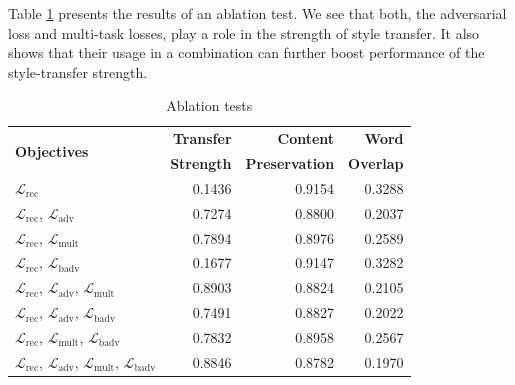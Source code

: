 Table \ref{tab:ablation-results} presents the results of an ablation test. We see that both, the adversarial loss and multi-task losses, play a role in the strength of style transfer. It also shows that their usage in a combination can further boost performance of the style-transfer strength.

\begin{table}[ht]
	\centering
	\begin{tabular}{| l | r | r | r |}
		\hline
		\multirow{2}{*}{
		\textbf{Objectives}}                                                                                     & \textbf{Transfer} & \textbf{Content}      & \textbf{Word}    \\
		                                                                                                         & \textbf{Strength} & \textbf{Preservation} & \textbf{Overlap} \\
		\hline
		\hline
		$\mathcal{L}_\text{rec}$                                                                                 & 0.1436            & 0.9154                & 0.3288           \\
		\hline
		$\mathcal{L}_\text{rec}$, $\mathcal{L}_\text{adv}$                                                       & 0.7274            & 0.8800                & 0.2037           \\
		\hline
		$\mathcal{L}_\text{rec}$, $\mathcal{L}_\text{mult}$                                                      & 0.7894            & 0.8976                & 0.2589           \\
		\hline
		$\mathcal{L}_\text{rec}$, $\mathcal{L}_\text{badv}$                                                      & 0.1677            & 0.9147                & 0.3282           \\
		\hline
		$\mathcal{L}_\text{rec}$, $\mathcal{L}_\text{adv}$, $\mathcal{L}_\text{mult}$                            & 0.8903            & 0.8824                & 0.2105           \\
		\hline
		$\mathcal{L}_\text{rec}$, $\mathcal{L}_\text{adv}$, $\mathcal{L}_\text{badv}$                            & 0.7491            & 0.8827                & 0.2022           \\
		\hline
		$\mathcal{L}_\text{rec}$, $\mathcal{L}_\text{mult}$, $\mathcal{L}_\text{badv}$                           & 0.7832            & 0.8958                & 0.2567           \\
		\hline
		$\mathcal{L}_\text{rec}$, $\mathcal{L}_\text{adv}$, $\mathcal{L}_\text{mult}$, $\mathcal{L}_\text{badv}$ & 0.8846            & 0.8782                & 0.1970           \\
		\hline
	\end{tabular}
	\caption{Ablation tests}
	\label{tab:ablation-results}
\end{table}


